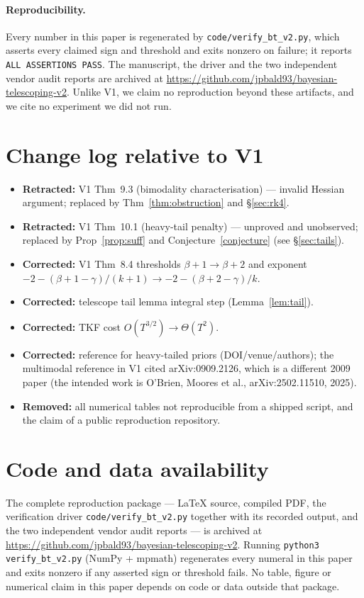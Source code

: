 \documentclass[11pt]{article}
\theoremstyle{definition}
\theoremstyle{remark}
\begin{document}
\paragraph{Reproducibility.} Every number in this paper is regenerated by
\texttt{code/verify\_bt\_v2.py}, which asserts every claimed sign and threshold and exits nonzero on
failure; it reports \texttt{ALL ASSERTIONS PASS}. The manuscript, the driver and the two independent
vendor audit reports are archived at \url{https://github.com/jpbald93/bayesian-telescoping-v2}.
Unlike V1, we claim no reproduction beyond these artifacts, and we cite no experiment we did not run.

\section*{Change log relative to V1}
\begin{itemize}
\item \textbf{Retracted:} V1 Thm~9.3 (bimodality characterisation) --- invalid Hessian argument;
replaced by Thm~\ref{thm:obstruction} and \S\ref{sec:rk4}.
\item \textbf{Retracted:} V1 Thm~10.1 (heavy-tail penalty) --- unproved and unobserved; replaced by
Prop~\ref{prop:suff} and Conjecture~\ref{conjecture} (see \S\ref{sec:tails}).
\item \textbf{Corrected:} V1 Thm~8.4 thresholds $\beta+1\to\beta+2$ and exponent
$-2-(\beta+1-\gamma)/(k+1)\to-2-(\beta+2-\gamma)/k$.
\item \textbf{Corrected:} telescope tail lemma integral step (Lemma~\ref{lem:tail}).
\item \textbf{Corrected:} TKF cost $O(T^{3/2})\to\Theta(T^2)$.
\item \textbf{Corrected:} reference for heavy-tailed priors (DOI/venue/authors); the multimodal
reference in V1 cited arXiv:0909.2126, which is a different 2009 paper (the intended work is
O'Brien, Moores et al., arXiv:2502.11510, 2025).
\item \textbf{Removed:} all numerical tables not reproducible from a shipped script, and the claim
of a public reproduction repository.
\end{itemize}

\section*{Code and data availability}
The complete reproduction package --- \LaTeX{} source, compiled PDF, the verification driver
\texttt{code/verify\_bt\_v2.py} together with its recorded output, and the two independent vendor
audit reports --- is archived at \url{https://github.com/jpbald93/bayesian-telescoping-v2}. Running
\texttt{python3 verify\_bt\_v2.py} (NumPy + mpmath) regenerates every numeral in this paper and exits
nonzero if any asserted sign or threshold fails. No table, figure or numerical claim in this paper
depends on code or data outside that package.
\end{document}
